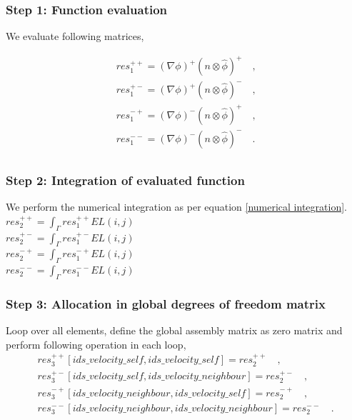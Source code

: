 \documentclass[a4paper,openany]{book}
\begin{document}
\subsubsection{Step 1: Function evaluation}

We evaluate following matrices,

\begin{equation}
\begin{split}
res_1^{++} = (\nabla \phi)^+ (n \otimes \hat{\phi})^+ \quad \textrm{,}\\
res_1^{+-} = (\nabla \phi)^+ (n \otimes \hat{\phi})^- \quad \textrm{,}\\
res_1^{-+} = (\nabla \phi)^- (n \otimes \hat{\phi})^+ \quad \textrm{,}\\
res_1^{--} = (\nabla \phi)^- (n \otimes \hat{\phi})^- \quad \textrm{.}\\
\end{split}
\end{equation}

\subsubsection{Step 2: Integration of evaluated function}

We perform the numerical integration as per equation \eqref{numerical integration}.
\\ 
$res_2^{++} = \int_{\Gamma} res_1^{++} EL(i,j)$\\
$res_2^{+-} = \int_{\Gamma} res_1^{+-} EL(i,j)$\\
$res_2^{-+} = \int_{\Gamma} res_1^{-+} EL(i,j)$\\
$res_2^{--} = \int_{\Gamma} res_1^{--} EL(i,j)$\\

\subsubsection{Step 3: Allocation in global degrees of freedom matrix}

Loop over all elements, define the global assembly matrix as zero matrix and perform following operation in each loop,
\begin{equation}
\begin{split}
res_3^{++}[ids\_velocity\_self,ids\_velocity\_self] = res_2^{++} \quad \textrm{,}\\
res_3^{+-}[ids\_velocity\_self,ids\_velocity\_neighbour] = res_2^{+-} \quad \textrm{,}\\
res_3^{-+}[ids\_velocity\_neighbour,ids\_velocity\_self] = res_2^{-+} \quad \textrm{,}\\
res_3^{--}[ids\_velocity\_neighbour,ids\_velocity\_neighbour] = res_2^{--} \quad \textrm{.}\\
\end{split}
\end{equation}
\end{document}
